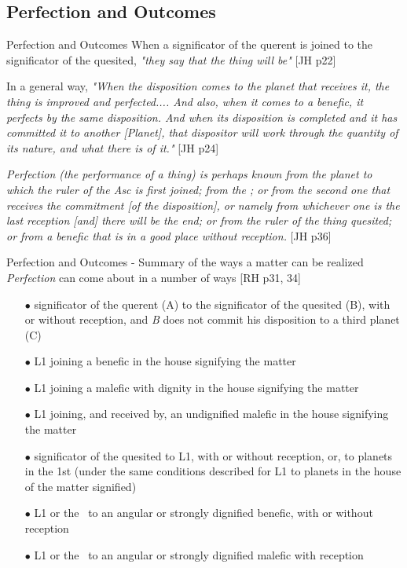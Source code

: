 \subsection{Perfection and Outcomes}
\begin{frame}[t]{Perfection and Outcomes}
When a significator of the querent is joined to the significator of the quesited, \textsl{"they say that the thing will be"} [JH p22]

In a general way, \textsl{"When the disposition comes to the planet that receives it, the thing is improved and perfected.... And also, when it comes to a benefic, it perfects by the same disposition. And when its disposition is completed and it has committed it to another [Planet], that dispositor will work through the quantity of its nature, and what there is of it."} [JH p24]

\begin{block}{}
\textsl{Perfection (the performance of a thing) is perhaps known from the planet to which the ruler of the Asc is first joined; from the \Moon; or from the second one that receives the commitment [of the disposition], or namely from whichever one is the last reception [and] there will be the end; or from the ruler of the thing quesited; or from a benefic that is in a good place without reception.} [JH p36]
\end{block}

\end{frame}
\begin{frame}[t]{Perfection and Outcomes - Summary of the ways a matter can be realized}
\textsl{Perfection} can come about in a number of ways [RH p31, 34]
\small
\begin{itemize}
\item[$\bullet$] significator of the querent (A) to the significator of the quesited (B), with or without reception, and \textsl{B} does not commit his disposition to a third planet (C)
\item[$\bullet$] L1 joining a benefic in the house signifying the matter
\item[$\bullet$] L1 joining a malefic with dignity in the house signifying the matter
\item[$\bullet$] L1 joining, and received by, an undignified malefic in the house signifying the matter
\item[$\bullet$] significator of the quesited to L1, with or without reception, or, to planets in the 1st (under the same conditions described for L1 to planets in the house of the matter signified)
\item[$\bullet$] L1 or the \Moon\ to an angular or strongly dignified benefic, with or without reception
\item[$\bullet$] L1 or the \Moon\ to an angular or strongly dignified malefic with reception
\end{itemize}

\end{frame}
